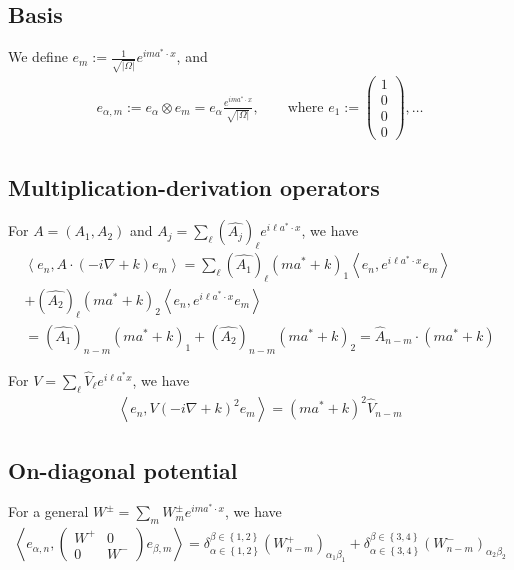 \documentclass[11pt,a4paper,reqno,french,tikz]{amsart}
\newcommand{\pa}[1]{\left( #1 \right)} %
\newcommand{\acs}[1]{\left\{ #1 \right\}} %
\newcommand{\ab}[1]{\left|#1\right|} %
\newcommand{\ps}[1]{\left< #1 \right>} %
\newcommand{\na}{\nabla} %
\newcommand{\f}[2]{\frac{#1}{#2}} %
\newcommand{\mat}[1]{\begin{pmatrix} #1 \end{pmatrix}} %
\begin{document}
\subsection{Basis}%
\label{sub:basis}

We define $e_m := \f{1}{\sqrt{\ab{\Omega}}} e^{i m a^* \cdot x}$, and
\begin{align*}
e_{\alpha,m} := e_\alpha \otimes e_m = e_\alpha \f{e^{ima^*\cdot x}}{\sqrt{\ab{\Omega}}}, \qquad \text{where } e_1 := \mat{1 \\ 0 \\ 0 \\ 0},\dots
\end{align*}

\subsection{Multiplication-derivation operators}%

For $A = (A_1,A_2)$ and $A_j = \sum_\ell \pa{\widehat{A_j}}_\ell e^{i \ell a^*\cdot x}$, we have
\begin{multline*}
\ps{e_n, A \cdot (-i\na +k) e_m} = \sum_{\ell} \pa{\widehat{A_1}}_\ell \pa{ma^* + k}_1\ps{e_n, e^{i\ell a^*\cdot x} e_m} \\
+ \pa{\widehat{A_2}}_\ell \pa{ma^* + k}_2\ps{e_n, e^{i\ell a^*\cdot x} e_m} \\
= \pa{\widehat{A_1}}_{n-m} \pa{ma^* + k}_1 + \pa{\widehat{A_2}}_{n-m} \pa{ma^* + k}_2 = \widehat{A}_{n-m} \cdot \pa{ma^*+k}
\end{multline*}

For $V = \sum_\ell \widehat{V}_\ell e^{i\ell a^*x}$, we have
\begin{align*}
\ps{e_n,V (-i\na + k)^2 e_m} =  \pa{ma^*+k}^2\widehat{V}_{n-m}
\end{align*}
\subsection{On-diagonal potential}%
\label{sub:on_diagonal_potential}



For a general $W^\pm = \sum_m W^\pm_m e^{im a^* \cdot x}$, we have
\begin{align*}
	\ps{e_{\alpha,n},\mat{W^+ & 0 \\ 0 & W^-} e_{\beta,m}} = \delta_{\alpha \in \acs{1,2}}^{\beta \in \acs{1,2}}\pa{W^+_{n-m}}_{\alpha_1 \beta_1} + \delta_{\alpha \in \acs{3,4}}^{\beta \in \acs{3,4}}\pa{W^-_{n-m}}_{\alpha_2 \beta_2}
\end{align*}
\end{document}
